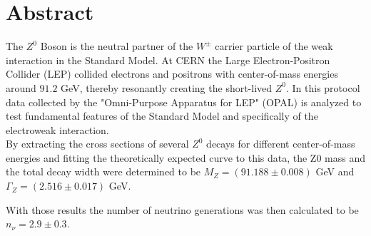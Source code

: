 \section*{Abstract}
	The $Z^0$ Boson is the neutral partner of the $W^{\pm}$ carrier particle of the weak interaction in the Standard Model. At CERN the Large Electron-Positron Collider (LEP) collided electrons and positrons with center-of-mass energies around $91.2$ GeV, thereby resonantly creating the short-lived $Z^0$. In this protocol data collected by the "Omni-Purpose Apparatus for LEP" (OPAL) is analyzed to test fundamental features of the Standard Model and specifically of the electroweak interaction.\\
	By extracting the cross sections of several $Z^0$ decays for different center-of-mass energies and fitting the theoretically expected curve to this data, the Z0 mass and the total decay width were determined to be $M_Z=(91.188\pm0.008)$ GeV and $\Gamma_Z= (2.516\pm0.017)$ GeV.
	
	With those results the number of neutrino generations was then calculated to be $n_{\nu}=2.9\pm0.3$.